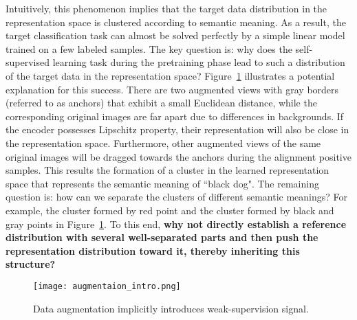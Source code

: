 Intuitively, this phenomenon implies that the target data distribution in the representation space is clustered according to semantic meaning. As a result, the target classification task can almost be solved perfectly by a simple linear model trained on a few labeled samples. The key question is: why does the self-supervised learning task during the pretraining phase lead to such a distribution of the target data in the representation space? Figure~\ref{fig: aug_intro} illustrates a potential explanation for this success. There are two augmented views with gray borders (referred to as anchors) that exhibit a small Euclidean distance, while the corresponding original images are far apart due to differences in backgrounds. If the encoder possesses Lipschitz property, their representation will also be close in the representation space. Furthermore, other augmented views of the same original images will be dragged towards the anchors during the alignment positive samples. This results the formation of a cluster in the learned representation space that represents the semantic meaning of ``black dog". The remaining question is: how can we separate the clusters of different semantic meanings? For example, the cluster formed by red point and the cluster formed by black and gray points in Figure~\ref{fig: aug_intro}. To this end, \textbf{why not directly establish a reference distribution with several well-separated parts and then push the representation distribution toward it, thereby inheriting this structure?}
\begin{figure}[t]
    \centering
    \texttt{[image: augmentaion\_intro.png]}
    \caption{Data augmentation implicitly introduces weak-supervision signal.}
    \label{fig: aug_intro}
\end{figure}

